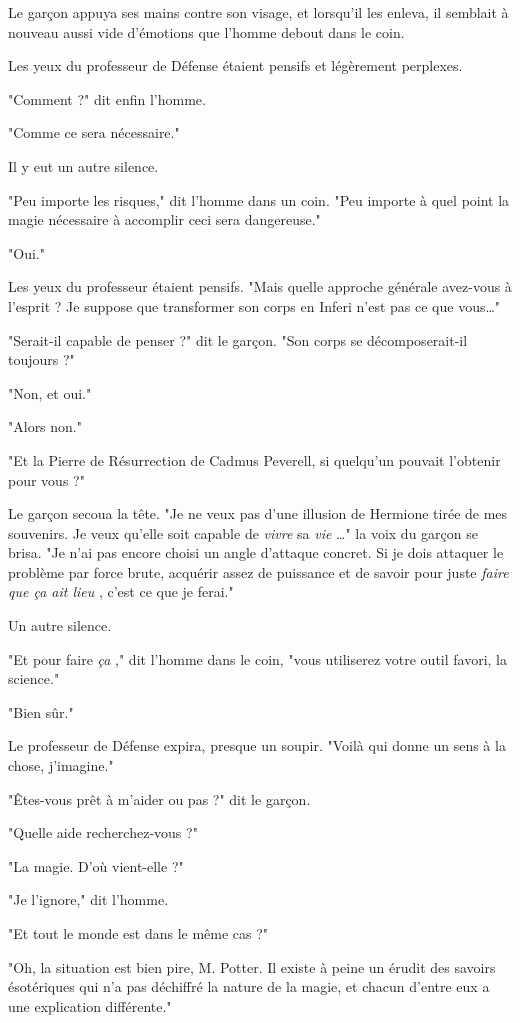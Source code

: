 Le garçon appuya ses mains contre son visage, et lorsqu'il les enleva, il semblait à nouveau aussi vide d'émotions que l'homme debout dans le coin.

Les yeux du professeur de Défense étaient pensifs et légèrement perplexes.

"Comment ?" dit enfin l'homme.

"Comme ce sera nécessaire."

Il y eut un autre silence.

"Peu importe les risques," dit l'homme dans un coin. "Peu importe à quel point la magie nécessaire à accomplir ceci sera dangereuse."

"Oui."

Les yeux du professeur étaient pensifs. "Mais quelle approche générale avez-vous à l'esprit ? Je suppose que transformer son corps en Inferi n'est pas ce que vous…"

"Serait-il capable de penser ?" dit le garçon. "Son corps se décomposerait-il toujours ?"

"Non, et oui."

"Alors non."

"Et la Pierre de Résurrection de Cadmus Peverell, si quelqu'un pouvait l'obtenir pour vous ?"

Le garçon secoua la tête. "Je ne veux pas d'une illusion de Hermione tirée de mes souvenirs. Je veux qu'elle soit capable de \emph{vivre}  sa \emph{vie} …" la voix du garçon se brisa. "Je n'ai pas encore choisi un angle d'attaque concret. Si je dois attaquer le problème par force brute, acquérir assez de puissance et de savoir pour juste \emph{faire que ça ait lieu} , c'est ce que je ferai."

Un autre silence.

"Et pour faire \emph{ça} ," dit l'homme dans le coin, "vous utiliserez votre outil favori, la science."

"Bien sûr."

Le professeur de Défense expira, presque un soupir. "Voilà qui donne un sens à la chose, j'imagine."

"Êtes-vous prêt à m'aider ou pas ?" dit le garçon.

"Quelle aide recherchez-vous ?"

"La magie. D'où vient-elle ?"

"Je l'ignore," dit l'homme.

"Et tout le monde est dans le même cas ?"

"Oh, la situation est bien pire, M. Potter. Il existe à peine un érudit des savoirs ésotériques qui n'a pas déchiffré la nature de la magie, et chacun d'entre eux a une explication différente."

